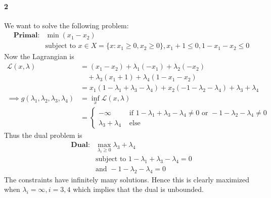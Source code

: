 \documentclass[12pt, leqno]{article}
\begin{document}
\paragraph{2} We want to solve the following problem:
\begin{align*}
\textbf{Primal:}&\min (x_1 - x_2) \\
&\text{subject to } x \in X = \{x:x_1 \geq 0, x_2 \geq 0\}, x_1+1 \leq
  0, 1 - x_1 - x_2 \leq 0
\end{align*}
Now the Lagrangian is 
\begin{align*}
\mathcal{L}(x,\lambda) &= (x_1 - x_2) + \lambda_1(-x_1) +
                         \lambda_2(-x_2) \\
&\quad + \lambda_3(x_1+1) + \lambda_4(1 - x_1 - x_2) \\
&= x_1(1-\lambda_1+\lambda_3-\lambda_4) + x_2(-1 - \lambda_2 -
  \lambda_4) + \lambda_3 + \lambda_4 \\
\implies g(\lambda_1,\lambda_2,\lambda_3,\lambda_4) &=
                                                      \inf_{x}\mathcal{L}
                                                      (x,\lambda) \\
&= \begin{cases} -\infty & \text{ if } 1-\lambda_1+\lambda_3-\lambda_4
  \not= 0 \text { or } -1 - \lambda_2 -
  \lambda_4 \not= 0 \\
\lambda_3 + \lambda_4 & \text{ else }
\end{cases}
\end{align*}
Thus the dual problem is 
\begin{align*}
\textbf{Dual:}&\max_{\lambda_i \geq 0} \lambda_3 + \lambda_4 \\
&\text{subject to } 1-\lambda_1+\lambda_3-\lambda_4
  = 0 \\
& \text {and } -1 - \lambda_2 -
  \lambda_4 = 0
\end{align*}
The constraints have
infinitely many solutions. Hence this is clearly maximized when
$\lambda_i = \infty, i = 3,4$ which implies that the
dual is unbounded. 
\end{document}
